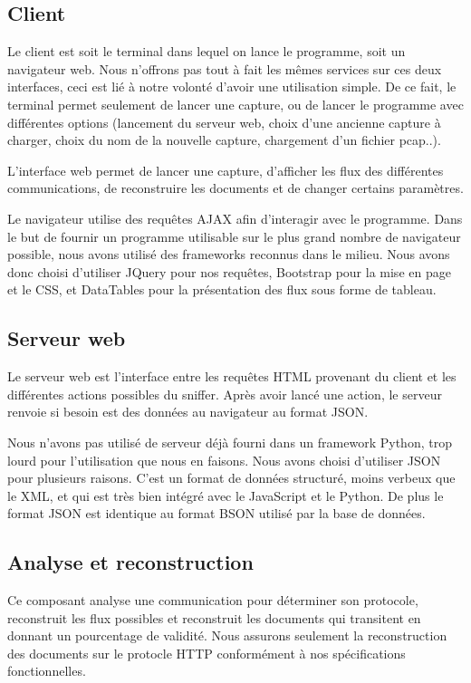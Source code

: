 \subsection{Client}
Le client est soit le terminal dans lequel on lance le programme, soit un navigateur web. Nous n'offrons pas tout à fait les mêmes services sur ces deux interfaces, ceci est lié à notre volonté d'avoir une utilisation simple. 
De ce fait, le terminal permet seulement de lancer une capture, ou de lancer le programme avec différentes options (lancement du serveur web, choix d'une ancienne capture à charger, choix du nom de la nouvelle capture, chargement d'un fichier pcap..).

L'interface web permet de lancer une capture, d'afficher les flux des différentes communications, de reconstruire les documents et de changer certains paramètres.

Le navigateur utilise des requêtes AJAX afin d'interagir avec  le programme.
Dans le but de fournir un programme utilisable sur le plus grand nombre de navigateur possible, nous avons utilisé des frameworks reconnus dans le milieu. Nous avons donc choisi d'utiliser JQuery pour nos requêtes, Bootstrap pour la mise en page et le CSS, et DataTables pour la présentation des flux sous forme de tableau. 

\subsection{Serveur web}
Le serveur web est l'interface entre les requêtes HTML provenant du client et les différentes actions possibles du sniffer. Après avoir lancé une action, le serveur renvoie si besoin est des données au navigateur au format
JSON. 

Nous n'avons pas utilisé de serveur déjà fourni dans un framework Python, trop lourd pour l'utilisation que nous en faisons.
Nous avons choisi d'utiliser JSON pour plusieurs raisons. C'est un format de données structuré, moins verbeux que le XML, et qui est très bien intégré avec le JavaScript et le Python. De plus le format JSON est identique au format BSON utilisé par la base de données. 

\subsection{Analyse et reconstruction}
Ce composant analyse une communication pour déterminer son protocole, reconstruit les flux possibles et reconstruit les documents qui transitent en donnant un pourcentage de validité. Nous assurons seulement la reconstruction des documents sur le protocle HTTP conformément à nos spécifications fonctionnelles.

